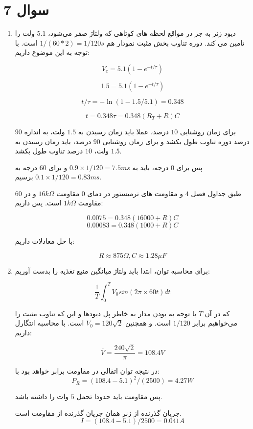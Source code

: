 \documentclass[12pt]{article}
\begin{document}
\KashidaOff


\section*{سوال 7}

\begin{enumerate}
	\item 

دیود زنر به جز در مواقع لحظه های کوتاهی که ولتاژ صفر می‌شود، $5.1$ ولت را تامین می کند. دوره تناوب بخش مثبت نمودار هم
$1/(60*2)=1/120 s$
است. با توجه به این موضوع داریم:

$$V_c =5.1 (1 - e^{-t / \tau})$$

$$1.5 = 5.1(1 - e^{-t/\tau}) $$

$$t/\tau = -\ln (1 - 1.5 /5.1) = 0.348$$

$$t= 0.348 \tau = 0.348 (R_T + R)C$$

برای زمان روشنایی $10$ درصد، عملا باید زمان رسیدن به $1.5$ ولت، به اندازه $90$ درصد دوره تناوب طول بکشد و برای زمان روشنایی $90$ درصد، باید زمان رسیدن به $1.5$ ولت، $10$ درصد تناوب طول بکشد.

پس برای $0$ درجه، باید به
$0.9 \times 1/120 = 7.5 ms$
و برای
$60$ درجه
به
$0.1 \times 1/120 = 0.83 ms$
برسیم.

طبق جداول فصل $4$ و مقاومت های ترمیستور در دمای $0$ مقاومت $16 k\Omega$ و در $60$ مقاومت $1k\Omega$ است. پس داریم:

$$0.0075 = 0.348(16000  + R)C$$
$$0.00083 = 0.348(1000+R)C$$

با حل معادلات داریم:

$$R\approx 875 \Omega , C \approx 1.28 \mu F$$

\item

برای محاسبه توان، ابتدا باید ولتاژ میانگین منبع تغذیه را بدست آوریم:

$$\frac{1}{T}\int_{0}^{T} V_0 sin(2 \pi \times 60 t) dt$$

که در آن $T$ با توجه به  بودن مدار به خاطر پل دیودها و این که تناوب مثبت را می‌خواهیم برابر $1/120$ است. و همچنین $V_0 =120 \sqrt{2}$ است. با محاسبه انتگارل داریم:

$$\bar{V} = \frac{240 \sqrt{2}}{\pi } = 108.4 V$$

در نتیجه توان اتقالی در مقاومت برابر خواهد بود با:
$$P_R =(108.4-5.1)^2 / (2500) = 4.27 W$$

پس مقاومت باید حدودا تحمل $5$ وات را داشته باشد.

جریان گذرنده از زنر همان جریان گذرنده از مقاومت است.
$$I = (108.4-5.1)/2500 = 0.041A$$


\end{enumerate}
\end{document}
